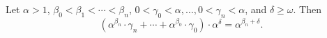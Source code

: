 Let $\alpha > 1$, $\beta_0 < \beta_1 < \cdots < \beta_n$, $0 < \gamma_0 < \alpha, \ldots, 0 < \gamma_n < \alpha$, and $\delta \ge \omega$. Then
$$(\alpha^{\beta_n} \cdot \gamma_n + \cdots + \alpha^{\beta_0} \cdot \gamma_0) \cdot \alpha^\delta = \alpha^{\beta_n + \delta}.$$
